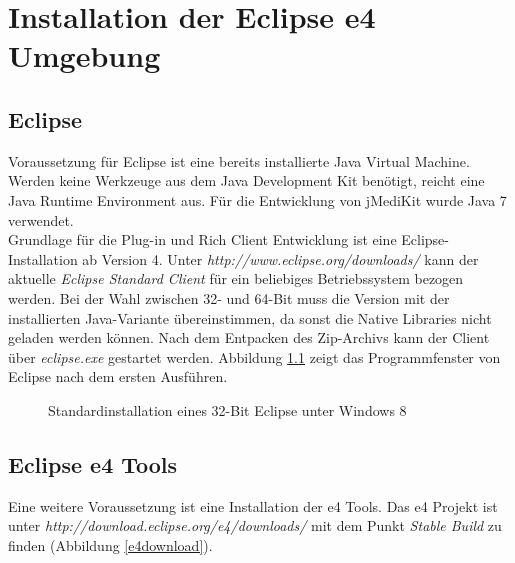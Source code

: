 \chapter{Installation der Eclipse e4 Umgebung} \label{install_eclipse}
\section{Eclipse}
Voraussetzung für Eclipse ist eine bereits installierte Java Virtual Machine. Werden keine Werkzeuge aus dem Java Development Kit benötigt, reicht eine Java Runtime Environment aus. Für die Entwicklung von jMediKit wurde Java 7 verwendet.\\
Grundlage für die Plug-in und Rich Client Entwicklung ist eine Eclipse-Installation ab Version 4. Unter \textit{http://www.eclipse.org/downloads/} kann der aktuelle \textit{Eclipse Standard Client} für ein beliebiges Betriebssystem bezogen werden. Bei der Wahl zwischen 32- und 64-Bit muss die Version mit der installierten Java-Variante übereinstimmen, da sonst die Native Libraries nicht geladen werden können. Nach dem Entpacken des Zip-Archivs kann der Client über \textit{eclipse.exe} gestartet werden. Abbildung \ref{eclipsestd} zeigt das Programmfenster von Eclipse nach dem ersten Ausführen.\\

\begin{figure}[H]
  \vspace{0.5cm}
  \centering
  \caption{Standardinstallation eines 32-Bit Eclipse unter Windows 8}
  \label{eclipsestd}
  \vspace{0.5cm}
\end{figure}

\section{Eclipse e4 Tools}
Eine weitere Voraussetzung ist eine Installation der e4 Tools. Das e4 Projekt ist unter \textit{http://download.eclipse.org/e4/downloads/} mit dem Punkt \textit{Stable Build} zu finden (Abbildung \ref{e4download}). 

